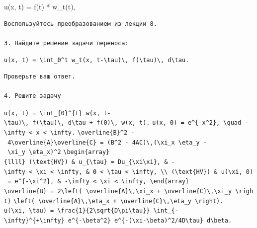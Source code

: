 \documentclass[
  ukrainian,
]{article}
\begin{document}
u(x, t) = f(t) * w\_t(t),

\begin{verbatim}
Воспользуйтесь преобразованием из лекции 8.

3. Найдите решение задачи переноса:
\end{verbatim}

\texttt{u(x,\ t)\ =\ \textbackslash{}int\_0\^{}t\ w\_t(x,\ t-\textbackslash{}tau)\textbackslash{},\ f(\textbackslash{}tau)\textbackslash{},\ d\textbackslash{}tau.}

\begin{verbatim}
Проверьте ваш ответ.

4. Решите задачу
\end{verbatim}

\texttt{u(x,\ t)\ =\ \textbackslash{}int\_\{0\}\^{}\{t\}\ w(x,\ t-\textbackslash{}tau)\textbackslash{},\ f\textquotesingle{}(\textbackslash{}tau)\textbackslash{},\ d\textbackslash{}tau\ +\ f(0)\textbackslash{},\ w(x,\ t).}
\texttt{u(x,\ 0)\ =\ e\^{}\{-x\^{}2\},\ \textbackslash{}quad\ -\textbackslash{}infty\ \textless{}\ x\ \textless{}\ \textbackslash{}infty.}
\texttt{\textbackslash{}overline\{B\}\^{}2\ -\ 4\textbackslash{}overline\{A\}\textbackslash{}overline\{C\}\ =\ (B\^{}2\ -\ 4AC)\textbackslash{},(\textbackslash{}xi\_x\ \textbackslash{}eta\_y\ -\ \textbackslash{}xi\_y\ \textbackslash{}eta\_x)\^{}2}
\texttt{\textbackslash{}begin\{array\}\{llll\}\ (\textbackslash{}text\{HV\})\ \&\ u\_\{\textbackslash{}tau\}\ =\ Du\_\{\textbackslash{}xi\textbackslash{}xi\},\ \&\ -\textbackslash{}infty\ \textless{}\ \textbackslash{}xi\ \textless{}\ \textbackslash{}infty,\ \&\ 0\ \textless{}\ \textbackslash{}tau\ \textless{}\ \textbackslash{}infty,\ \textbackslash{}\textbackslash{}\ (\textbackslash{}text\{HV\})\ \&\ u(\textbackslash{}xi,\ 0)\ =\ e\^{}\{-\textbackslash{}xi\^{}2\},\ \&\ -\textbackslash{}infty\ \textless{}\ \textbackslash{}xi\ \textless{}\ \textbackslash{}infty,\ \textbackslash{}end\{array\}}
\texttt{\textbackslash{}overline\{B\}\ =\ 2\textbackslash{}left(\ \textbackslash{}overline\{A\}\textbackslash{},\textbackslash{}xi\_x\ +\ \textbackslash{}overline\{C\}\textbackslash{},\textbackslash{}xi\_y\ \textbackslash{}right)}
\texttt{\textbackslash{}left(\ \textbackslash{}overline\{A\}\textbackslash{},\textbackslash{}eta\_x\ +\ \textbackslash{}overline\{C\}\textbackslash{},\textbackslash{}eta\_y\ \textbackslash{}right).}
\texttt{u(\textbackslash{}xi,\ \textbackslash{}tau)\ =\ \textbackslash{}frac\{1\}\{2\textbackslash{}sqrt\{D\textbackslash{}pi\textbackslash{}tau\}\}\ \textbackslash{}int\_\{-\textbackslash{}infty\}\^{}\{+\textbackslash{}infty\}\ e\^{}\{-\textbackslash{}beta\^{}2\}\ e\^{}\{-(\textbackslash{}xi-\textbackslash{}beta)\^{}2/4D\textbackslash{}tau\}\ d\textbackslash{}beta.}
\end{document}
